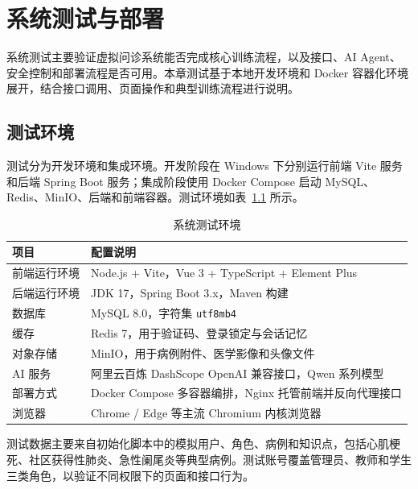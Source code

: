 \chapter{系统测试与部署}

系统测试主要验证虚拟问诊系统能否完成核心训练流程，以及接口、AI Agent、安全控制和部署流程是否可用。本章测试基于本地开发环境和 Docker 容器化环境展开，结合接口调用、页面操作和典型训练流程进行说明。

\section{测试环境}

测试分为开发环境和集成环境。开发阶段在 Windows 下分别运行前端 Vite 服务和后端 Spring Boot 服务；集成阶段使用 Docker Compose 启动 MySQL、Redis、MinIO、后端和前端容器。测试环境如表~\ref{tab:test_env} 所示。

\begin{table}[H]
    \centering
    \caption{系统测试环境}
    \label{tab:test_env}
    \begin{tabular}{ll}
        \toprule
        项目 & 配置说明 \\
        \midrule
        前端运行环境 & Node.js + Vite，Vue 3 + TypeScript + Element Plus \\
        后端运行环境 & JDK 17，Spring Boot 3.x，Maven 构建 \\
        数据库 & MySQL 8.0，字符集 \texttt{utf8mb4} \\
        缓存 & Redis 7，用于验证码、登录锁定与会话记忆 \\
        对象存储 & MinIO，用于病例附件、医学影像和头像文件 \\
        AI 服务 & 阿里云百炼 DashScope OpenAI 兼容接口，Qwen 系列模型 \\
        部署方式 & Docker Compose 多容器编排，Nginx 托管前端并反向代理接口 \\
        浏览器 & Chrome / Edge 等主流 Chromium 内核浏览器 \\
        \bottomrule
    \end{tabular}
\end{table}

测试数据主要来自初始化脚本中的模拟用户、角色、病例和知识点，包括心肌梗死、社区获得性肺炎、急性阑尾炎等典型病例。测试账号覆盖管理员、教师和学生三类角色，以验证不同权限下的页面和接口行为。

